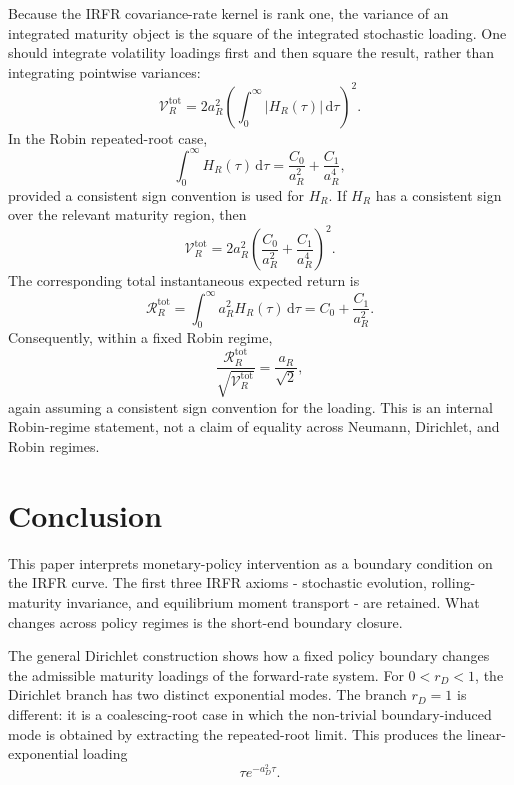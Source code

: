 \documentclass[11pt]{article}
\newcommand{\dd}{\,\mathrm{d}}
\numberwithin{equation}{section}
\begin{document}
Because the IRFR covariance-rate kernel is rank one, the variance of an integrated maturity object is the square of the integrated stochastic loading. One should integrate volatility loadings first and then square the result, rather than integrating pointwise variances:
\begin{equation}
\mathcal{V}^{\mathrm{tot}}_R
=
2a_R^2\left(\int_0^\infty |H_R(\tau)|\dd\tau\right)^2.
\end{equation}
In the Robin repeated-root case,
\begin{equation}
\int_0^\infty H_R(\tau)\dd\tau
=
\frac{C_0}{a_R^2}+\frac{C_1}{a_R^4},
\end{equation}
provided a consistent sign convention is used for $H_R$. If $H_R$ has a consistent sign over the relevant maturity region, then
\begin{equation}
\mathcal{V}^{\mathrm{tot}}_R
=
2a_R^2\left(\frac{C_0}{a_R^2}+\frac{C_1}{a_R^4}\right)^2.
\end{equation}
The corresponding total instantaneous expected return is
\begin{equation}
\mathcal{R}^{\mathrm{tot}}_R
=
\int_0^\infty a_R^2H_R(\tau)\dd\tau
=
C_0+\frac{C_1}{a_R^2}.
\end{equation}
Consequently, within a fixed Robin regime,
\begin{equation}
\frac{\mathcal{R}^{\mathrm{tot}}_R}{\sqrt{\mathcal{V}^{\mathrm{tot}}_R}}
=
\frac{a_R}{\sqrt{2}},
\end{equation}
again assuming a consistent sign convention for the loading. This is an internal Robin-regime statement, not a claim of equality across Neumann, Dirichlet, and Robin regimes.


\section{Conclusion}

This paper interprets monetary-policy intervention as a boundary condition on the IRFR curve. The first three IRFR axioms - stochastic evolution, rolling-maturity invariance, and equilibrium moment transport - are retained. What changes across policy regimes is the short-end boundary closure.

The general Dirichlet construction shows how a fixed policy boundary changes the admissible maturity loadings of the forward-rate system. For $0<r_D<1$, the Dirichlet branch has two distinct exponential modes. The branch $r_D=1$ is different: it is a coalescing-root case in which the non-trivial boundary-induced mode is obtained by extracting the repeated-root limit. This produces the linear-exponential loading
\begin{equation}
\tau e^{-a_D^2\tau}.
\end{equation}
\end{document}
